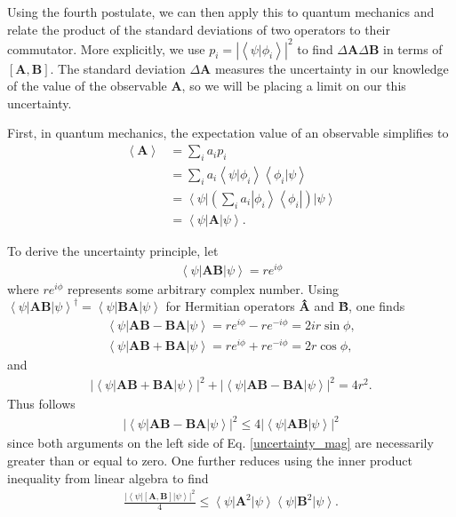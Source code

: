 \documentclass[11pt]{article} %
\newcommand{\bra}[1]{\left\langle #1 \right|}
\newcommand{\ket}[1]{\left|#1\right\rangle}
\newcommand{\braket}[2]{\left\langle#1 |  #2\right\rangle}
\begin{document}
Using the fourth postulate, we can then apply this to quantum mechanics and relate the product of the standard deviations of two operators to their commutator. More explicitly, we use $p_i = \left|\braket{\psi}{\phi_i}\right|^2$ to find $\Delta\textbf{A}\Delta\textbf{B}$ in terms of $[\textbf{A},\textbf{B}]$. The standard deviation $\Delta\textbf{A}$ measures the uncertainty in our knowledge of the value of the observable \textbf{A}, so we will be placing a limit on our this uncertainty.

First, in quantum mechanics, the expectation value of an observable simplifies to
\begin{align}
    \left<\textbf{A}\right> &= \sum_ia_ip_i\nonumber\\
    &= \sum_ia_i\braket{\psi}{\phi_i}\braket{\phi_i}{\psi}\\
    &= \bra{\psi}\left(\sum_ia_i\ket{\phi_i}\bra{\phi_i}\right)\ket{\psi}\nonumber\\
    &= \bra{\psi}\textbf{A}\ket{\psi}.
\end{align}

To derive the uncertainty principle, let
\begin{align}
    \bra{\psi}\textbf{AB}\ket{\psi} = re^{i\phi}
\end{align}
where $re^{i\phi}$ represents some arbitrary complex number. Using $\bra{\psi}\textbf{AB}\ket{\psi}^\dagger = \bra{\psi}\textbf{BA}\ket{\psi}$ for Hermitian operators \textbf{\^A} and \textbf{\^B}, one finds
\begin{align}
    \bra{\psi}\textbf{AB}-\textbf{BA}\ket{\psi} = re^{i\phi} - re^{-i\phi} = 2ir\sin\phi,\\
    \bra{\psi}\textbf{AB}+\textbf{BA}\ket{\psi} = re^{i\phi} + re^{-i\phi} = 2r\cos\phi,
\end{align}{}
and
\begin{align}
    \left|\bra{\psi}\textbf{AB}+\textbf{BA}\ket{\psi}\right|^2 + \left|\bra{\psi}\textbf{AB}-\textbf{BA}\ket{\psi}\right|^2 = 4r^2.
    \label{uncertainty_mag}
\end{align}
Thus follows
\begin{align}
    \left|\bra{\psi}\textbf{AB}-\textbf{BA}\ket{\psi}\right|^2 \leq 4\left|\bra{\psi}\textbf{AB}\ket{\psi}\right|^2
\end{align}
since both arguments on the left side of 
Eq. \ref{uncertainty_mag} are necessarily greater than or equal to zero. One further reduces using the inner product inequality from linear algebra to find
\begin{align}
    \frac{\left|\bra{\psi}\left[\textbf{A},\textbf{B}\right]\ket{\psi}\right|^2}{4} \leq \bra{\psi}\textbf{A}^2\ket{\psi}\bra{\psi}\textbf{B}^2\ket{\psi}.
\end{align}
\end{document}
